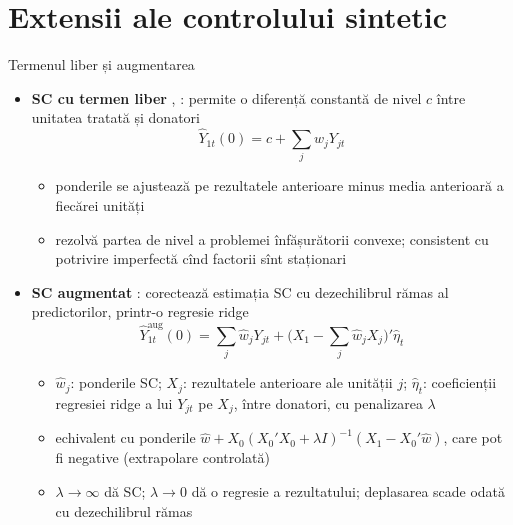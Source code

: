 \section{Extensii ale controlului sintetic}

\begin{frame}{Termenul liber și augmentarea}
\itemsize{\small}
\begin{itemize}
    \item \textbf{SC cu termen liber} , : permite o diferență constantă de nivel $c$ între unitatea tratată și donatori \[ \hat Y_{1t}(0) = c + \sum_j w_jY_{jt} \]
    \begin{itemize}
        \item ponderile se ajustează pe rezultatele anterioare minus media anterioară a fiecărei unități
        \item rezolvă partea de nivel a problemei înfășurătorii convexe; consistent cu potrivire imperfectă cînd factorii sînt staționari 
    \end{itemize}
    \item \textbf{SC augmentat} : corectează estimația SC cu dezechilibrul rămas al predictorilor, printr-o regresie ridge \[ \hat Y^{\mathrm{aug}}_{1t}(0) = \sum_j\hat w_jY_{jt} + \Big(X_1 - \sum_j\hat w_jX_j\Big)'\hat\eta_t \]
    \begin{itemize}
        \item $\hat w_j$: ponderile SC; $X_j$: rezultatele anterioare ale unității $j$; $\hat\eta_t$: coeficienții regresiei ridge a lui $Y_{jt}$ pe $X_j$, între donatori, cu penalizarea $\lambda$
        \item echivalent cu ponderile $\hat w + X_0(X_0'X_0 + \lambda I)^{-1}(X_1 - X_0'\hat w)$, care pot fi negative (extrapolare controlată)
        \item $\lambda \to \infty$ dă SC; $\lambda \to 0$ dă o regresie a rezultatului; deplasarea scade odată cu dezechilibrul rămas
    \end{itemize}
\end{itemize}
\end{frame}

